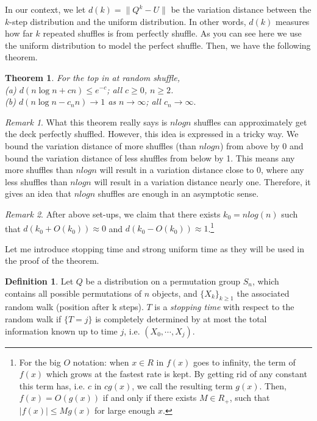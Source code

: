 \documentclass[12pt]{article}
\theoremstyle{plain}
\newtheorem{theorem}{Theorem}
\theoremstyle{definition}
\newtheorem{definition}{Definition}
\theoremstyle{remark}
\newtheorem*{remark}{Remark}
\begin{document}
In our context, we let $d(k)=\big\|Q^k-U\big\|$ be the variation distance between the $k$-step distribution and the uniform distribution. In other words, $d(k)$ measures how far $k$ repeated shuffles is from perfectly shuffle. As you can see here we use the uniform distribution to model the perfect shuffle. Then, we have the following theorem.

\begin{theorem} \cite[Theorem~1 on \pno~335]{1.1}
For the top in at random shuffle,\\
(a) $d(n\log n + cn)\leq e^{-c}$; all $c\geq 0$, $n \geq 2$.\\
(b) $d(n\log n - c_nn)\rightarrow 1$ as $n\rightarrow \infty$; all $c_n \rightarrow \infty.$
\end{theorem}

\begin{remark}
What this theorem really says is $nlogn$ shuffles can approximately get the deck perfectly shuffled. However, this idea is expressed in a tricky way. We bound the variation distance of more shuffles (than $nlogn$) from above by 0 and bound the variation distance of less shuffles from below by 1. This means any more shuffles than $nlogn$ will result in a variation distance close to 0, where any less shuffles than $nlogn$ will result in a variation distance nearly one. Therefore, it gives an idea that $nlogn$ shuffles are enough in an asymptotic sense.
\end{remark}

\begin{remark}\cite{1.1}
After above set-ups, we claim that there exists $k_0=nlog(n)$ such that $d(k_0+O(k_0))\approx0$ and $d(k_0-O(k_0))\approx1$.\footnote{For the big $O$ notation: when $x\in R$ in $f(x)$ goes to infinity, the term of $f(x)$ which grows at the fastest rate is kept. By getting rid of any constant this term has, i.e. $c$ in $cg(x)$, we call the resulting term $g(x)$. Then, $f(x)=O(g(x))$ if and only if there exists $M \in R_+$, such that  $|f(x)|\leq Mg(x)$ for large enough $x$.  } 
\end{remark}

Let me introduce stopping time and strong uniform time as they will be used in the proof of the theorem.
\begin{definition}
  Let $Q$ be a distribution on a permutation group $S_n$, which contains all possible permutations of $n$ objects, and $\{X_k\}_{k\geq1}$ the associated random walk (position after k steps). $T$ is a \textit{stopping time} with respect to the random walk if $\{T=j\}$ is completely determined by at most the total information known up to time $j$, i.e. $(X_0,\cdots,X_j)$.
\end{definition}
\end{document}
